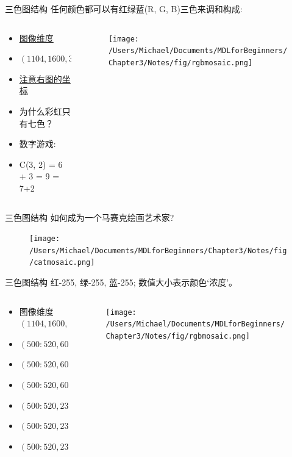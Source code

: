 \documentclass[handout]{beamer}
\begin{document}
\begin{frame}{三色图结构}
任何颜色都可以有红绿蓝(R, G, B)三色来调和构成:
\begin{columns}
	\begin{column}{0.35\textwidth}
		\begin{itemize}
			\item \underline{图像维度} 
			\item \footnotesize{$(1104, 1600, 3)$}
			\item \underline{注意右图的坐标}
			\item 为什么彩虹只有七色？
			\item 数字游戏:
			\item C(3, 2) = 6 + 3 = 9 = 7+2 
		\end{itemize}
	\end{column}
	\begin{column}{0.65\textwidth}
		\begin{figure}[H]
	\texttt{[image: /Users/Michael/Documents/MDLforBeginners/Chapter3/Notes/fig/rgbmosaic.png]}
\end{figure}	
	\end{column}
\end{columns}
\end{frame}

\begin{frame}{三色图结构}
	如何成为一个马赛克绘画艺术家?
	\begin{figure}[H]
		\centering
		\texttt{[image: /Users/Michael/Documents/MDLforBeginners/Chapter3/Notes/fig/catmosaic.png]}
	\end{figure}
\end{frame}

\begin{frame}{三色图结构}
红-255, 绿-255, 蓝-255; 数值大小表示颜色`浓度’。
\begin{columns}
	\begin{column}{0.35\textwidth}
		\begin{itemize}
			\item \footnotesize{图像维度 $(1104, 1600, 3)$}
			\item $(500:520, 600:620, 0)$
			\item $(500:520, 600:620, 1)$
			\item $(500:520, 600:620, 2)$
			\item $(500:520, 230:250, 0)$
			\item $(500:520, 230:250, 1)$
			\item $(500:520, 230:250, 2)$
		\end{itemize}
	\end{column}
	\begin{column}{0.65\textwidth}
		\begin{figure}[H]
	\texttt{[image: /Users/Michael/Documents/MDLforBeginners/Chapter3/Notes/fig/rgbmosaic.png]}
\end{figure}	
	\end{column}
\end{columns}
\end{frame}
\end{document}
